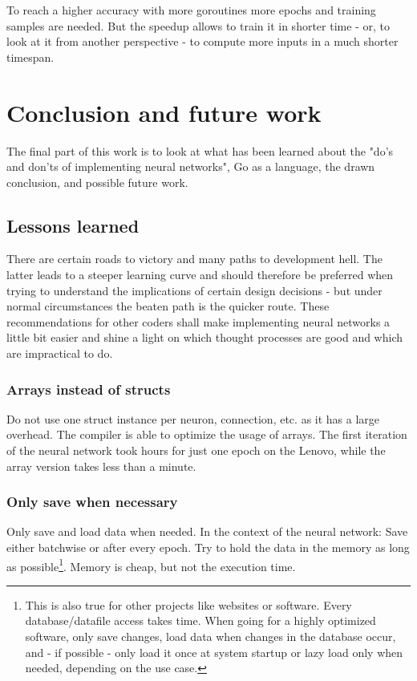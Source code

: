 \documentclass[11pt]{article}
\begin{document}
To reach a higher accuracy with more goroutines more epochs and training samples are needed. But the speedup allows to train it in shorter time - or, to look at it from another perspective - to compute more inputs in a much shorter timespan.

\section{Conclusion and future work}
The final part of this work is to look at what has been learned about the "do's and don'ts of implementing neural networks", Go as a language, the drawn conclusion, and possible future work.

\subsection{Lessons learned}
There are certain roads to victory and many paths to development hell. The latter leads to a steeper learning curve and should therefore be preferred when trying to understand the implications of certain design decisions - but under normal circumstances the beaten path is the quicker route. These recommendations for other coders shall make implementing neural networks a little bit easier and shine a light on which thought processes are good and which are impractical to do.

\subsubsection{Arrays instead of structs}
Do not use one struct instance per neuron, connection, etc. as it has a large overhead. The compiler is able to optimize the usage of arrays. The first iteration of the neural network took hours for just one epoch on the Lenovo, while the array version takes less than a minute.

\subsubsection{Only save when necessary}
Only save and load data when needed. In the context of the neural network: Save either batchwise or after every epoch. Try to hold the data in the memory as long as possible\footnote{This is also true for other projects like websites or software. Every database/datafile access takes time. When going for a highly optimized software, only save changes, load data when changes in the database occur, and - if possible - only load it once at system startup or lazy load only when needed, depending on the use case.}. Memory is cheap, but not the execution time.
\end{document}
